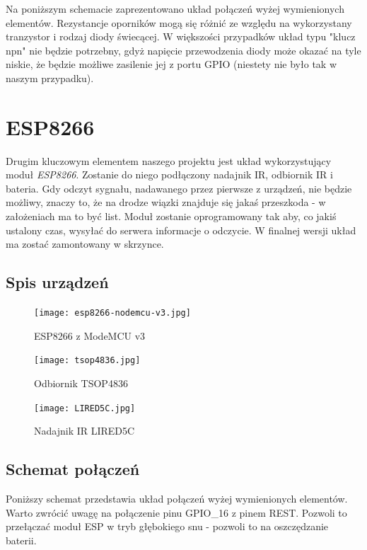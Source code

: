 Na poniższym schemacie zaprezentowano układ połączeń wyżej wymienionych elementów. Rezystancje oporników mogą się różnić ze względu na wykorzystany tranzystor i rodzaj diody świecącej. W większości przypadków układ typu "klucz npn" nie będzie potrzebny, gdyż napięcie przewodzenia diody może okazać na tyle niskie, że będzie możliwe zasilenie jej z portu GPIO (niestety nie było tak w naszym przypadku).

\begin{center}
\end{center}


\section{ESP8266}

Drugim kluczowym elementem naszego projektu jest układ wykorzystujący moduł \emph{ESP8266}. Zostanie do niego podłączony nadajnik IR, odbiornik IR i bateria. Gdy odczyt sygnału, nadawanego przez pierwsze z urządzeń, nie będzie możliwy, znaczy to, że na drodze wiązki znajduje się jakaś przeszkoda - w założeniach ma to być list. Moduł zostanie oprogramowany tak aby, co jakiś ustalony czas, wysyłać do serwera informacje o odczycie. W finalnej wersji układ ma zostać zamontowany w skrzynce.
\subsection{Spis urządzeń}



	\begin{figure}[H]
	\centering
	\texttt{[image: esp8266-nodemcu-v3.jpg]}
	\caption{ESP8266 z ModeMCU v3}
	\end{figure}
	
	\begin{figure}[H]
	\centering
	\texttt{[image: tsop4836.jpg]}
	\caption{Odbiornik TSOP4836 }
	\end{figure}
	
	
	\begin{figure}[H]
	\centering
	\texttt{[image: LIRED5C.jpg]}
	\caption{Nadajnik IR LIRED5C}
	\end{figure}

\subsection{Schemat połączeń}

Poniższy schemat przedstawia układ połączeń wyżej wymienionych elementów. Warto zwrócić uwagę na połączenie pinu GPIO\_16 z pinem REST. Pozwoli to przełączać moduł ESP w tryb głębokiego snu - pozwoli to na oszczędzanie baterii.

